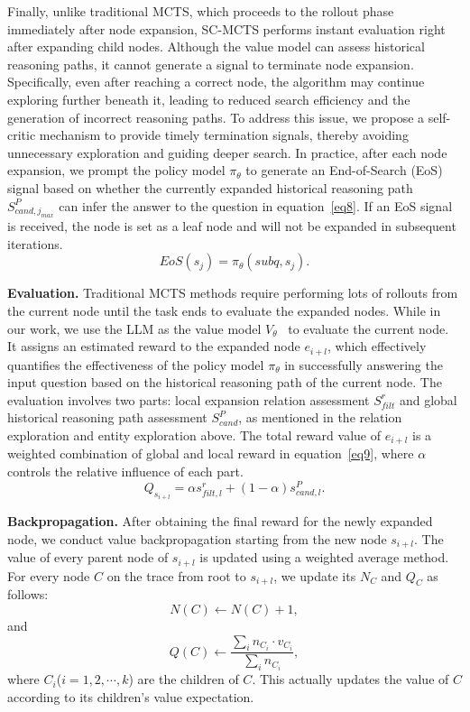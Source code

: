 \documentclass[lettersize,journal]{IEEEtran}
\begin{document}
Finally, unlike traditional MCTS, which proceeds to the rollout phase immediately after node expansion, SC-MCTS performs instant evaluation right after expanding child nodes. Although the value model can assess historical reasoning paths, it cannot generate a signal to terminate node expansion. Specifically, even after reaching a correct node, the algorithm may continue exploring further beneath it, leading to reduced search efficiency and the generation of incorrect reasoning paths. To address this issue, we propose a self-critic mechanism to provide timely termination signals, thereby avoiding unnecessary exploration and guiding deeper search.  In practice, after each node expansion, we prompt the policy model $\pi_{\theta}$ to generate an End-of-Search (EoS) signal based on whether the currently expanded historical reasoning path $S^{P}_{cand, j_{max}}$ can infer the answer to the question in equation~\ref{eq8}. If an EoS signal is received, the node is set as a leaf node and will not be expanded in subsequent iterations. 
\begin{equation}
    EoS(s_j) = \pi_{\theta}(subq, s_j).
    \label{eq8}
\end{equation}

\textbf{Evaluation.} Traditional MCTS methods require performing lots of rollouts from the current node until the task ends to evaluate the expanded nodes. While in our work, we use the LLM as the value model $V_\theta$~\cite{lightman2023let} to evaluate the current node. It assigns an estimated reward to the expanded node $e_{i+l}$, which effectively quantifies the effectiveness of the policy model $\pi_{\theta}$ in successfully answering the input question based on the historical reasoning path of the current node. The evaluation involves two parts: local expansion relation assessment $S^{r}_{filt}$ and global historical reasoning path assessment $S^{P}_{cand}$, as mentioned in the relation exploration and entity exploration above. The total reward value of $e_{i+l}$ is a weighted combination of global and local reward in equation~\ref{eq9}, where $\alpha$ controls the relative influence of each part.
\begin{equation}
    Q_{s_{i+l}} = \alpha s^{r}_{filt, l} + (1-\alpha) s^{P}_{cand, l}.
    \label{eq9}
\end{equation}

\textbf{Backpropagation.} After obtaining the final reward for the newly expanded node, we conduct value backpropagation starting from the new node $s_{i+l}$. The value of every parent node of $s_{i+l}$ is updated using a weighted average method. For every node $C$ on the trace from root to $s_{i+l}$, we update its $N_{C}$ and $Q_C$ as follows:
\begin{equation}
    N(C) \leftarrow N(C) + 1,
    \label{eq10}
\end{equation}
and 
\begin{equation}
    Q(C) \leftarrow \frac{\sum_{i} n_{C_i} \cdot v_{C_i}}{\sum_{i} n_{C_i}},
    \label{eq11}
\end{equation}
where $C_i$($i=1, 2, \cdots, k$) are the children of $C$. This actually updates the value of $C$ according to its children's value expectation.
\end{document}
